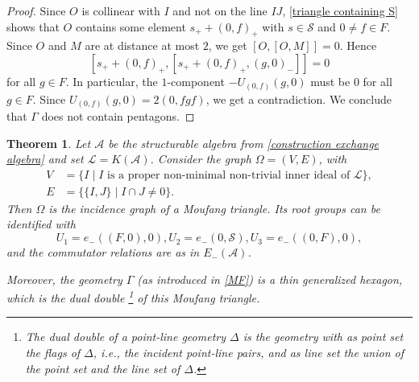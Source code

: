 \documentclass[oneside,a4paper]{amsart} %
\newtheorem{theorem}{Theorem}[section]
\theoremstyle{definition}
\newcommand{\A}{\mathcal{A}}
\renewcommand{\SS}{\mathcal{S}}
\newcommand{\LL}{\mathcal{L}}
\numberwithin{equation}{section}
\begin{document}
\begin{proof}
    Since $O$ is collinear with $I$ and not on the line $IJ$, \cref{triangle containing S} shows that $O$ contains some element $s_++(0,f)_+$ with $s\in\SS$ and $0 \neq f \in F$.
    Since $O$ and $M$ are at distance at most $2$, we get $[O,[O,M]]=0$.
    Hence
    \[ [s_++(0,f)_+,[s_++(0,f)_+,(g,0)_-]]=0 \]
    for all $g\in F$.
    In particular, the $1$-component $-U_{(0,f)}(g,0)$ must be $0$ for all $g\in F$.
    Since $U_{(0,f)}(g,0)=2(0,fgf)$, we get a contradiction.
    We conclude that $\Gamma$ does not contain pentagons.
\end{proof}


\begin{theorem}
\label{triangle root groups}
	Let $\A$ be the structurable algebra from \cref{construction exchange algebra} and set $\LL=K(\A)$. 
	Consider the graph $\Omega=(V,E)$, with
	\begin{align*}
	   V &= \{ I \mid I \text{ is a proper non-minimal non-trivial inner ideal of $\LL$} \} , \\
	   E &= \{ \{ I,J \} \mid I \cap J\neq 0 \} . 
	\end{align*}
	Then $\Omega$ is the incidence graph of a Moufang triangle.
	Its root groups can be identified with
	\[ U_1=e_-((F,0),0), U_2=e_-(0,\SS), U_3=e_-((0,F),0),  \]
	and the commutator relations are as in $E_-(\A)$.
	
	Moreover, the geometry $\Gamma$ (as introduced in \cref{MF}) is a thin generalized hexagon, which is the dual double%
	\footnote{The \textit{dual double} of a point-line geometry $\Delta$ is the geometry with as point set the \textit{flags} of $\Delta$, i.e., the incident point-line pairs, and as line set the union of the point set and the line set of $\Delta$.}
	of this Moufang triangle.
\end{theorem}
\end{document}
